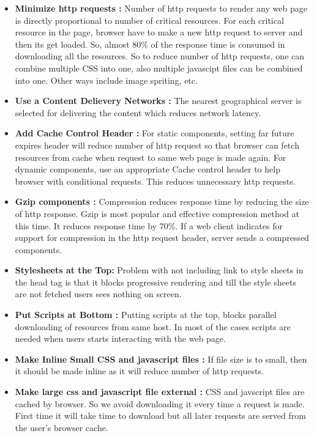 \documentclass[conference]{IEEEtran}
\begin{document}
\begin{itemize}
\item \textbf{Minimize http requests :}
Number of http requests to render any web page is directly proportional to
number of critical resources.
For each critical resource in the page, browser have to make a new http request 
to server and then its get loaded. So, almost 80\% of the response time is
consumed in downloading all the resources. So to reduce number of http
requests, one can combine multiple CSS into one, also multiple javascipt files can
be combined into one. Other ways include image spriting, etc.

\item \textbf{Use a Content Delievery Networks :}
The nearest geographical server is selected for delivering the content which reduces network latency.

\item \textbf{Add Cache Control Header :}
For static components, setting far future expires header will reduce number of http request
so that browser can fetch resources from cache when request to same web page is made again.
For dynamic components, use an appropriate Cache control header to help browser
with conditional requests. This reduces unnecessary http requests.

\item \textbf{Gzip components :}
Compression reduces response time by reducing the size of http response.
Gzip is most popular and effective compression method at this time. It reduces
response time by 70\%. If a web client indicates for support for compression in
the http request header, server sends a compressed components.

\item \textbf{Stylesheets at the Top: }
Problem with not including link to style sheets in the head tag is that it blocks
progressive rendering and till the style sheets are not fetched users sees nothing
on screen.

\item \textbf{Put Scripts at Bottom :}
Putting scripts at the top, blocks parallel downloading of resources from same host.
In most of the cases scripts are needed when users starts interacting with the web page. 

\item \textbf{Make Inline Small CSS and javascript files :}
If file size is to small, then it should be made inline as it will reduce number
of http requests.

\item \textbf{Make large css and javascript file external :}
CSS and javscript files are cached by browser. So we avoid downloading it every time a request is made.
First time it will take time to download but all later requests are served from the user's browser cache.


\end{itemize}
\end{document}
